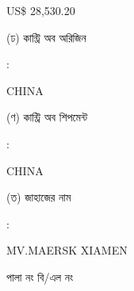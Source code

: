 \documentclass[12pt]{article}
\newcommand{\price}{US\$ 28,530.20}
\newcommand{\co}{CHINA}
\newcommand{\coship}{CHINA}
\newcommand{\vessel}{MV.MAERSK XIAMEN}
\begin{document}
\begin{minipage}[t]{0.53\linewidth}
{\price}
\\
\end{minipage}
\begin{minipage}[t]{0.05\linewidth}
\hspace*{1em}
\end{minipage}
\begin{minipage}[t]{0.40\linewidth}
(ঢ) কান্ট্রি অব অরিজিন
\end{minipage}
\begin{minipage}[t]{0.02\linewidth}
:
\end{minipage}
\begin{minipage}[t]{0.53\linewidth}
{\co}
\\
\end{minipage}
\begin{minipage}[t]{0.05\linewidth}
\hspace*{1em}
\end{minipage}
\begin{minipage}[t]{0.40\linewidth}
(ণ) কান্ট্রি অব শিপমেন্ট
\end{minipage}
\begin{minipage}[t]{0.02\linewidth}
:
\end{minipage}
\begin{minipage}[t]{0.53\linewidth}
{\coship}
\\
\end{minipage}
\begin{minipage}[t]{0.05\linewidth}
\hspace*{1em}
\end{minipage}
\begin{minipage}[t]{0.40\linewidth}
(ত) জাহাজের নাম
\end{minipage}
\begin{minipage}[t]{0.02\linewidth}
:
\end{minipage}
\begin{minipage}[t]{0.53\linewidth}
{\vessel}
\end{minipage}
\begin{minipage}[t]{0.05\linewidth}
\hspace*{1em}
\end{minipage}
\begin{minipage}[t]{0.40\linewidth}
\hspace*{1.8em}পালা নং বি/এল নং
\end{minipage}
\begin{minipage}[t]{0.02\linewidth}
\hspace{1em}
\end{minipage}
\end{document}
